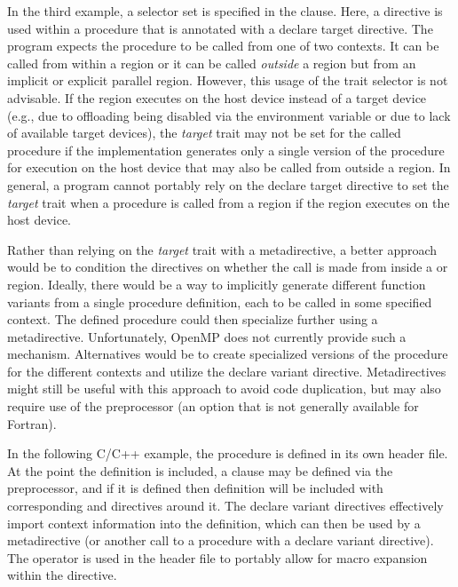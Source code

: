 
In the third example, a  selector set is specified in the
 clause. Here, a  directive is used within a
procedure  that is annotated with a declare target
directive. The program expects the procedure to be called from one of two
contexts. It can be called from within a  region or it can
be called \emph{outside} a  region but from an implicit or
explicit parallel region. However, this usage of the  trait
selector is not advisable. If the  region executes on the
host device instead of a target device (e.g., due to offloading being disabled
via the  environment variable or due to lack of
available target devices), the \emph{target} trait may not be set for the
called procedure if the implementation generates only a single version of the
procedure for execution on the host device that may also be called from outside
a  region. In general, a program cannot portably rely on the
declare target directive to set the \emph{target} trait when a procedure is
called from a  region if the region executes on the host device.



Rather than relying on the \emph{target} trait with a metadirective, a better
approach would be to condition the directives on whether the call is made from
inside a  or  region. Ideally, there would be a
way to implicitly generate different function variants from a single procedure
definition, each to be called in some specified context. The defined procedure
could then specialize further using a metadirective. Unfortunately, OpenMP
does not currently provide such a mechanism. Alternatives would be to create
specialized versions of the procedure for the different contexts and utilize
the declare variant directive. Metadirectives might still be useful with this
approach to avoid code duplication, but may also require use of the
preprocessor (an option that is not generally available for Fortran).

In the following C/C++ example, the procedure  is defined in
its own header file. At the point the definition is included, a 
clause may be defined via the preprocessor, and if it is defined then
definition will be included with corresponding 
and  directives around it. The declare variant
directives effectively import context information into the definition, which
can then be used by a metadirective (or another call to a procedure with a
declare variant directive). The  operator is used in the header
file to portably allow for macro expansion within the directive.

